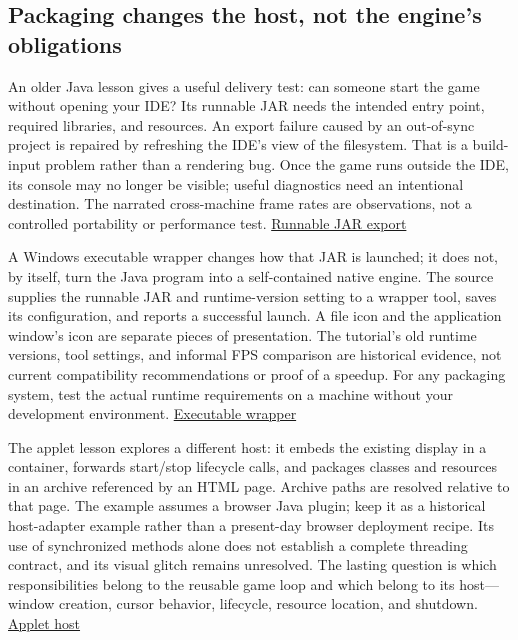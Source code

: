 \subsection{Packaging changes the host, not the engine's obligations}\label{05-engine-i-ch013-packaging-changes-the-host-not-the-engines-obligations}

\hypertarget{05-engine-i-ch013-packaging-changes-the-host-not-the-engines-obligations}{}

An older Java lesson gives a useful delivery test: can someone start the game without opening your IDE? Its runnable JAR needs the intended entry point, required libraries, and resources. An export failure caused by an out-of-sync project is repaired by refreshing the IDE's view of the filesystem. That is a build-input problem rather than a rendering bug. Once the game runs outside the IDE, its console may no longer be visible; useful diagnostics need an intentional destination. The narrated cross-machine frame rates are observations, not a controlled portability or performance test. \href{https://www.youtube.com/watch?v=velhSXA2CnQ}{Runnable JAR export}

A Windows executable wrapper changes how that JAR is launched; it does not, by itself, turn the Java program into a self-contained native engine. The source supplies the runnable JAR and runtime-version setting to a wrapper tool, saves its configuration, and reports a successful launch. A file icon and the application window's icon are separate pieces of presentation. The tutorial's old runtime versions, tool settings, and informal FPS comparison are historical evidence, not current compatibility recommendations or proof of a speedup. For any packaging system, test the actual runtime requirements on a machine without your development environment. \href{https://www.youtube.com/watch?v=ucW3mBoTyTw}{Executable wrapper}

The applet lesson explores a different host: it embeds the existing display in a container, forwards start/stop lifecycle calls, and packages classes and resources in an archive referenced by an HTML page. Archive paths are resolved relative to that page. The example assumes a browser Java plugin; keep it as a historical host-adapter example rather than a present-day browser deployment recipe. Its use of synchronized methods alone does not establish a complete threading contract, and its visual glitch remains unresolved. The lasting question is which responsibilities belong to the reusable game loop and which belong to its host---window creation, cursor behavior, lifecycle, resource location, and shutdown. \href{https://www.youtube.com/watch?v=WkBMoCbbgO0}{Applet host}

